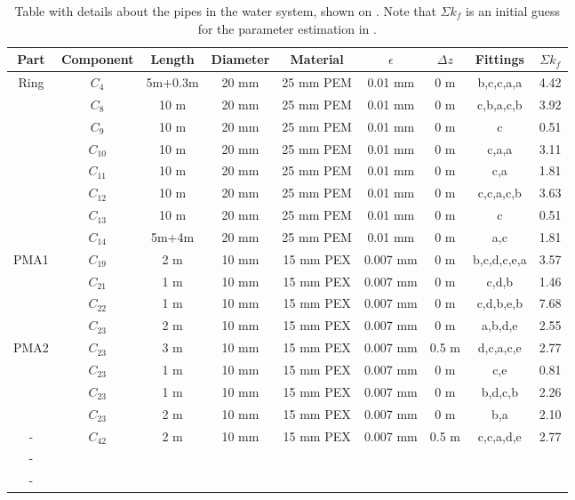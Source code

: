 \begin{table}[]
\centering
\begin{tabular}{c|c|c|c|c|c|c|c|c}
Part & Component & Length & Diameter & Material & $\epsilon$ & $\Delta z$& Fittings   & $\Sigma k_f$  \\\hline
Ring & $C_4$ 	 & 5m+0.3m& 20 mm 	 & 25 mm PEM& 0.01 mm 	 & 0 m 		 & b,c,c,a,a  &  4.42  		  \\ %
 	 & $C_8$ 	 & 10 m	  & 20 mm 	 & 25 mm PEM& 0.01 mm 	 & 0 m 	 	 & c,b,a,c,b  &  3.92  		  \\
 	 & $C_9$ 	 & 10 m	  & 20 mm 	 & 25 mm PEM& 0.01 mm 	 & 0 m 		 & c 	      &  0.51 		  \\
	 & $C_{10}$  & 10 m	  & 20 mm 	 & 25 mm PEM& 0.01 mm 	 & 0 m 		 & c,a,a 	  &  3.11 		  \\
 	 & $C_{11}$  & 10 m	  & 20 mm 	 & 25 mm PEM& 0.01 mm 	 & 0 m 		 & c,a 		  &  1.81 		  \\
 	 & $C_{12}$  & 10 m	  & 20 mm 	 & 25 mm PEM& 0.01 mm 	 & 0 m 		 & c,c,a,c,b  &  3.63		  \\
 	 & $C_{13}$  & 10 m   & 20 mm 	 & 25 mm PEM& 0.01 mm 	 & 0 m 		 & c 		  &  0.51		  \\
 	 & $C_{14}$  & 5m+4m  & 20 mm 	 & 25 mm PEM& 0.01 mm 	 & 0 m 		 & a,c 		  &  1.81  		  \\ \hline
PMA1 & $C_{19}$	 & 2 m 	  & 10 mm    & 15 mm PEX& 0.007 mm   & 0 m 		 & b,c,d,c,e,a&  3.57 		  \\ %
	 & $C_{21}$  & 1 m 	  & 10 mm    & 15 mm PEX& 0.007 mm   & 0 m 		 & c,d,b 	  &  1.46 		  \\
 	 & $C_{22}$  & 1 m 	  & 10 mm    & 15 mm PEX& 0.007 mm   & 0 m 		 & c,d,b,e,b  &  7.68  		  \\
 	 & $C_{23}$  & 2 m 	  & 10 mm    & 15 mm PEX& 0.007 mm   & 0 m 		 & a,b,d,e    &  2.55  		  \\ \hline
PMA2 & $C_{23}$  & 3 m	  & 10 mm    & 15 mm PEX& 0.007 mm   & 0.5 m  	 & d,c,a,c,e  &  2.77	      \\
 	 & $C_{23}$  & 1 m 	  & 10 mm    & 15 mm PEX& 0.007 mm   & 0 m 		 & c,e 		  &  0.81    	  \\
 	 & $C_{23}$  & 1 m 	  & 10 mm    & 15 mm PEX& 0.007 mm   & 0 m 	   	 & b,d,c,b 	  &  2.26     	  \\
 	 & $C_{23}$  & 2 m 	  & 10 mm    & 15 mm PEX& 0.007 mm   & 0 m 		 & b,a 		  &  2.10    	  \\ \hline
- 	 & $C_{42}$  & 2 m    & 10 mm 	 & 15 mm PEX& 0.007 mm   & 0.5 m 	 & c,c,a,d,e  &  2.77 		  \\
- 	 &  &  &  &  &  &  &    \\
- 	 &  &  &  &  &  &  &   
\end{tabular}
\caption{Table with details about the pipes in the water system, shown on . Note that $\Sigma k_f$ is an initial guess for the parameter estimation in .}
\label{tab:pip_detail}
\end{table}

